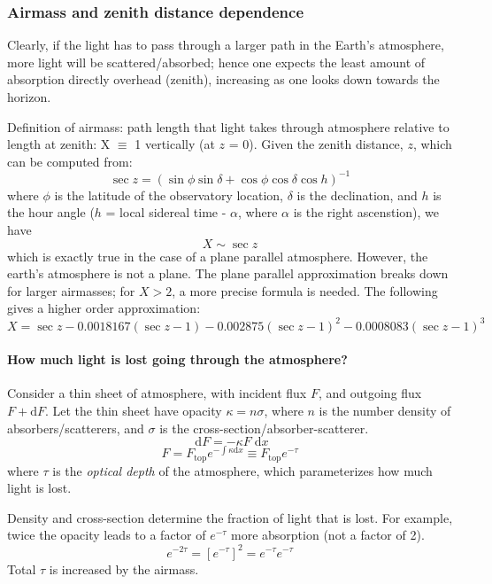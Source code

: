 \documentclass[12pt]{article}
\newcommand{\mynotes}[1]{\textcolor{myBlue}{#1}}
\newcommand{\dd}{\;\mathrm{d}}
\begin{document}
\subsubsection{Airmass and zenith distance dependence}
Clearly, if the light has to pass through a larger path in the Earth's
atmosphere, more light will be scattered/absorbed; hence one expects
the least amount of absorption directly overhead (zenith), increasing
as one looks down towards the horizon.

Definition of airmass: path length that light takes through atmosphere
relative to length at zenith: X $\equiv$ 1 vertically (at $z$ = 0).
Given the zenith distance, $z$, which can be computed from:
\[
    \sec z = \left( \sin\phi\sin\delta +
    \cos\phi\cos\delta\cos h \right)^{-1}
    \]
where $\phi$ is the latitude of the observatory location, $\delta$ is the
declination, and $h$ is the hour angle ($h$ = local sidereal time - $\alpha$,
where $\alpha$ is the right ascenstion), we have
\[
    X \sim \sec z
    \]
which is exactly true in the case of a plane parallel atmosphere. However, the
earth's atmosphere is not a plane. The plane parallel approximation breaks down
for larger airmasses; for $X>2$, a more precise formula is needed. The
following gives a higher order approximation:
\[
    X = \sec z - 0.0018167(\sec z-1)
    - 0.002875(\sec z-1)^{2} - 0.0008083(\sec z-1)^{3}
    \]

\paragraph{How much light is lost going through the atmosphere?}
Consider a thin sheet of atmosphere, with incident flux $F$, and outgoing flux
$F + \mathrm{d}F$. Let the thin sheet have opacity $\kappa = n\sigma$, where
$n$ is the number density of absorbers/scatterers, and $\sigma$ is the
cross-section/absorber-scatterer.
\[
    \dd{F} = -\kappa F \dd{x}
     \]
\[
    F = F_{\mathrm{top}} e^{-\int\kappa\mathrm{d}x}
     \equiv F_{\mathrm{top}} e^{-\tau}
     \]
where $\tau$ is the \textit{optical depth} of the atmosphere, which
parameterizes how much light is lost.

\mynotes{Density and cross-section determine the fraction
of light that is lost. For example, twice the opacity leads to
a factor of $e^{-\tau}$ more absorption (not a factor of 2).
\[
    e^{-2\tau} = \left[ e^{-\tau} \right]^{2} = e^{-\tau} e^{-\tau}
    \]
Total $\tau$ is increased by the airmass.}
\end{document}
